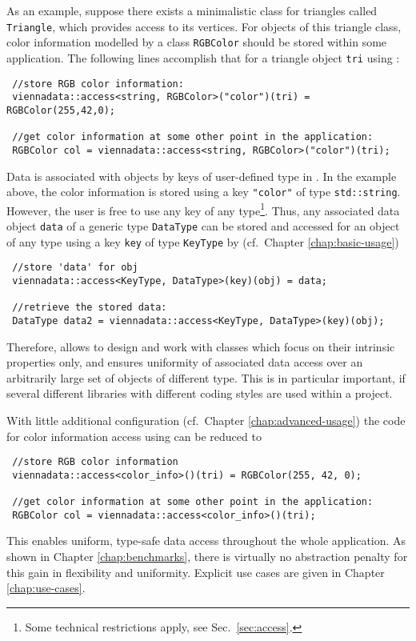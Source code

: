 As an example, suppose there exists a minimalistic class for triangles called \lstinline|Triangle|,
which provides access to its vertices. For objects of this triangle class, color information modelled by a class \lstinline|RGBColor| should be stored within some application.
The following lines accomplish that for a triangle object \lstinline|tri| using {\ViennaData}:
\begin{lstlisting}
 //store RGB color information:
 viennadata::access<string, RGBColor>("color")(tri) = RGBColor(255,42,0);

 //get color information at some other point in the application:
 RGBColor col = viennadata::access<string, RGBColor>("color")(tri);
\end{lstlisting}
Data is associated with objects by keys of user-defined type in {\ViennaData}. In the example above,
the color information is stored using a key \lstinline|"color"| of type \lstinline|std::string|.
However, the user is free to use any key of any type\footnote{Some technical restrictions apply, see Sec.~\ref{sec:access}.}.
Thus, any associated data object \lstinline|data| of a generic type \lstinline|DataType| can be stored and accessed for an object of any type using a key \lstinline|key| of type \lstinline|KeyType|
by (cf.~Chapter \ref{chap:basic-usage})
\begin{lstlisting}
 //store 'data' for obj
 viennadata::access<KeyType, DataType>(key)(obj) = data;

 //retrieve the stored data:
 DataType data2 = viennadata::access<KeyType, DataType>(key)(obj);
\end{lstlisting}
Therefore, {\ViennaData} allows to design and work with classes which focus on their intrinsic properties only, and
ensures uniformity of associated data access over an arbitrarily large set of objects of different type.
This is in particular important, if several different libraries with different coding styles are used within a project.

With little additional configuration (cf.~Chapter \ref{chap:advanced-usage}) the code for color information access using {\ViennaData} can be reduced to
\begin{lstlisting}
 //store RGB color information
 viennadata::access<color_info>()(tri) = RGBColor(255, 42, 0);

 //get color information at some other point in the application:
 RGBColor col = viennadata::access<color_info>()(tri);
\end{lstlisting}
This enables uniform, type-safe data access throughout the whole application.
As shown in Chapter \ref{chap:benchmarks}, there is virtually no abstraction penalty for this gain in flexibility and uniformity. Explicit use cases are given in Chapter \ref{chap:use-cases}.

